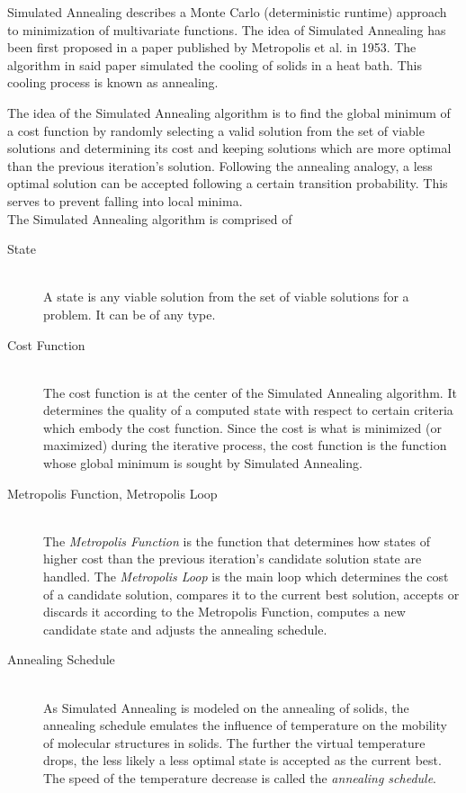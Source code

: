 \documentclass[12pt]{article}
\begin{document}
Simulated Annealing \cite{genpro} describes a Monte Carlo (deterministic runtime) approach to minimization of multivariate functions. The idea of Simulated Annealing has been first proposed in a paper published by Metropolis et al. in 1953. The algorithm in said paper simulated the cooling of solids in a heat bath. This cooling process is known as annealing.

The idea of the Simulated Annealing algorithm is to find the global minimum of a cost function by randomly selecting a valid solution from the set of viable solutions and determining its cost and keeping solutions which are more optimal than the previous iteration's solution. Following the annealing analogy, a less optimal solution can be accepted following a certain transition probability. This serves to prevent falling into local minima. \\ 
The Simulated Annealing algorithm is comprised of

\begin{description}
\item[State]~\\
\label{state}
A state is any viable solution from the set of viable solutions for a problem. It can be of any type.
\item[Cost Function]~\\
\label{cofu}
The cost function is at the center of the Simulated Annealing algorithm. It determines the quality of a computed state with respect to certain criteria which embody the cost function. Since the cost is what is minimized (or maximized) during the iterative process, the cost function is the function whose global minimum is sought by Simulated Annealing. \\
\item[Metropolis Function, Metropolis Loop]~\\
\label{metro}
The \emph{Metropolis Function} is the function that determines how states of higher cost than the previous iteration's candidate solution state are handled. The \emph{Metropolis Loop} is the main loop which determines the cost of a candidate solution, compares it to the current best solution, accepts or discards it according to the Metropolis Function, computes a new candidate state and adjusts the annealing schedule.
\item[Annealing Schedule]~\\
\label{anneal}
As Simulated Annealing is modeled on the annealing of solids, the annealing schedule emulates the influence of temperature on the mobility of molecular structures in solids. The further the virtual temperature drops, the less likely a less optimal state is accepted as the current best. The speed of the temperature decrease is called the \emph{annealing schedule}.
\end{description} 
\end{document}
